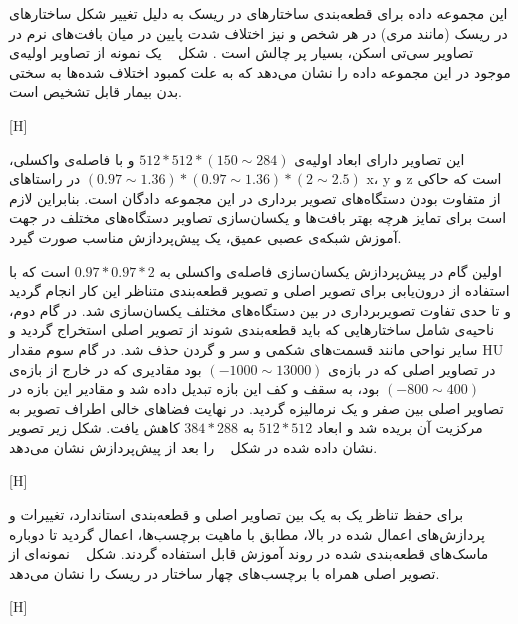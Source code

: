 این مجموعه داده برای قطعه‌بندی ساختارهای در ریسک به دلیل تغییر شکل ساختار‌های در ریسک (مانند مری) در هر شخص و نیز اختلاف شدت پایین در میان بافت‌های نرم در تصاویر سی‌تی اسکن، بسیار پر چالش است . شکل ~ یک نمونه از تصاویر اولیه‌ی موجود در این مجموعه داده را نشان می‌دهد که به علت کمبود اختلاف شده‌ها به سختی بدن بیمار قابل تشخیص است. 

[H]

این تصاویر دارای ابعاد اولیه‌ی $512*512*(150\sim 284)$ و با فاصله‌ی واکسلی،
 $(0.97\sim1.36)*(0.97\sim1.36)*(2\sim2.5)$
 در راستاهای x، y و z است که حاکی از متفاوت بودن دستگاه‌های تصویر برداری در این مجموعه دادگان است. بنابراین لازم است برای تمایز هرچه بهتر بافت‌ها و یکسان‌سازی تصاویر دستگاه‌های مختلف در جهت آموزش شبکه‌ی عصبی عمیق، یک پیش‌پردازش مناسب صورت گیرد.
 
اولین گام در پیش‌پردازش یکسان‌سازی فاصله‌ی واکسلی به $0.97*0.97*2$ است که با استفاده از درون‌یابی برای تصویر اصلی و تصویر قطعه‌بندی متناظر این کار انجام گردید و تا حدی تفاوت تصویربرداری در بین دستگاه‌های مختلف یکسان‌سازی شد. در گام دوم، ناحیه‌ی شامل ساختارهایی که باید قطعه‌بندی شوند از تصویر اصلی استخراج گردید و سایر نواحی مانند قسمت‌های شکمی و سر و گردن حذف شد. در گام سوم مقدار HU در تصاویر اصلی که در بازه‌ی $(-1000\sim 13000)$ بود مقادیری که در خارج از بازه‌ی $(-800\sim 400)$ بود، به سقف و کف این بازه تبدیل داده شد و مقادیر این بازه در تصاویر اصلی بین صفر و یک نرمالیزه گردید. در نهایت فضاهای خالی اطراف تصویر به مرکزیت آن بریده شد و ابعاد $512*512$ به $384*288$ کاهش یافت. شکل زیر تصویر نشان داده شده در شکل ~ را بعد از پیش‌پردازش نشان می‌دهد.

[H]

برای حفظ تناظر یک به یک بین تصاویر اصلی و قطعه‌بندی استاندارد، تغییرات و پردازش‌های اعمال شده در بالا، مطابق با ماهیت برچسب‌ها، اعمال گردید تا دوباره ماسک‌های قطعه‌بندی شده در روند آموزش قابل استفاده گردند. شکل ~ نمونه‌ای از تصویر اصلی همراه با برچسب‌های چهار ساختار در ریسک را نشان می‌دهد.

[H]

